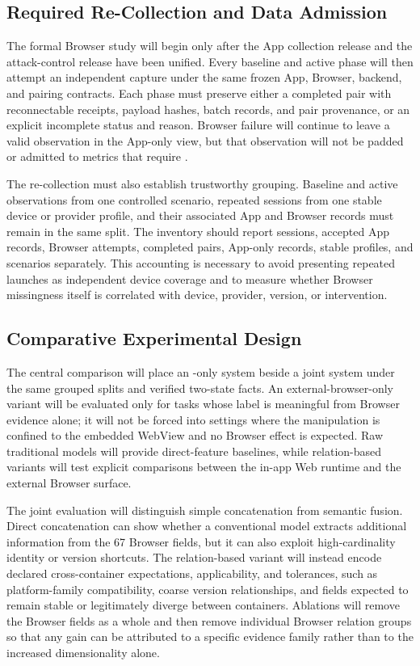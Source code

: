 \subsection{Required Re-Collection and Data Admission}

The formal Browser study will begin only after the App collection release and the attack-control release have been unified. Every baseline and active phase will then attempt an independent \browserfp capture under the same frozen App, Browser, backend, and pairing contracts. Each phase must preserve either a completed pair with reconnectable receipts, payload hashes, batch records, and pair provenance, or an explicit incomplete status and reason. Browser failure will continue to leave a valid \appfp observation in the App-only view, but that observation will not be padded or admitted to metrics that require \pairedfp.

The re-collection must also establish trustworthy grouping. Baseline and active observations from one controlled scenario, repeated sessions from one stable device or provider profile, and their associated App and Browser records must remain in the same split. The inventory should report sessions, accepted App records, Browser attempts, completed pairs, App-only records, stable profiles, and scenarios separately. This accounting is necessary to avoid presenting repeated launches as independent device coverage and to measure whether Browser missingness itself is correlated with device, provider, version, or intervention.

\subsection{Comparative Experimental Design}

The central comparison will place an \appfp-only system beside a joint \pairedfp system under the same grouped splits and verified two-state facts. An external-browser-only variant will be evaluated only for tasks whose label is meaningful from Browser evidence alone; it will not be forced into settings where the manipulation is confined to the embedded WebView and no Browser effect is expected. Raw traditional models will provide direct-feature baselines, while relation-based variants will test explicit comparisons between the in-app Web runtime and the external Browser surface.

The joint evaluation will distinguish simple concatenation from semantic fusion. Direct concatenation can show whether a conventional model extracts additional information from the 67 Browser fields, but it can also exploit high-cardinality identity or version shortcuts. The relation-based variant will instead encode declared cross-container expectations, applicability, and tolerances, such as platform-family compatibility, coarse version relationships, and fields expected to remain stable or legitimately diverge between containers. Ablations will remove the Browser fields as a whole and then remove individual Browser relation groups so that any gain can be attributed to a specific evidence family rather than to the increased dimensionality alone.

